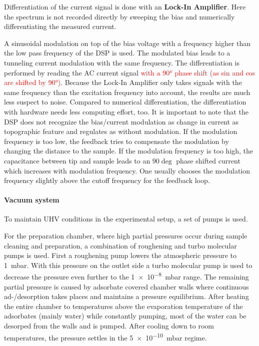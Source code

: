 Differentiation of the current signal is done with an \textbf{Lock-In Amplifier}. Here the spectrum is not recorded directly by sweeping the bias and numerically differentiating the measured current. 
	
A sinusoidal modulation on top of the bias voltage with a frequency higher than the low pass frequency of the DSP is used. The modulated bias leads to a tunneling current modulation with the same frequency. The differentiation is performed by reading the AC current signal \textcolor{red}{with a 90° phase shift (as sin and cos are shifted by 90°)}. Because the Lock-In Amplifier only takes signals with the same frequency than the excitation frequency into account, the results are much less suspect to noise. Compared to numerical differentiation, the differentiation with hardware needs less computing effort, too. It is important to note that the DSP does not recognize the bias/current modulation as change in current as topographic feature and regulates as without modulation. If the modulation frequency is too low, the feedback tries to compensate the modulation by changing the distance to the sample. If the modulation frequency is too high, the capacitance between tip and sample leads to an $90\deg$ phase shifted current which increases with modulation frequency. One usually chooses the modulation frequency slightly above the cutoff frequency for the feedback loop.

\paragraph{Vacuum system}
To maintain UHV conditions in the experimental setup, a set of pumps is used.

For the preparation chamber, where high partial pressures occur during sample cleaning and preparation, a combination of roughening and turbo molecular pumps is used. First a roughening pump lowers the atmospheric pressure to \SI{1}{\milli \bar}. With this pressure on the outlet side a turbo molecular pump is used to decrease the pressure even further to the  \SI{1e-8}{\milli \bar} range. The remaining partial pressure is caused by adsorbate covered chamber walls where continuous ad-/desorption takes places and maintains a pressure equilibrium. After heating the entire chamber to temperatures above the evaporation temperature of the adsorbates (mainly water) while constantly pumping, most of the water can be desorped from the walls and is pumped. After cooling down to room temperatures, the pressure settles in the \SI{5e-10}{\milli \bar} regime.

